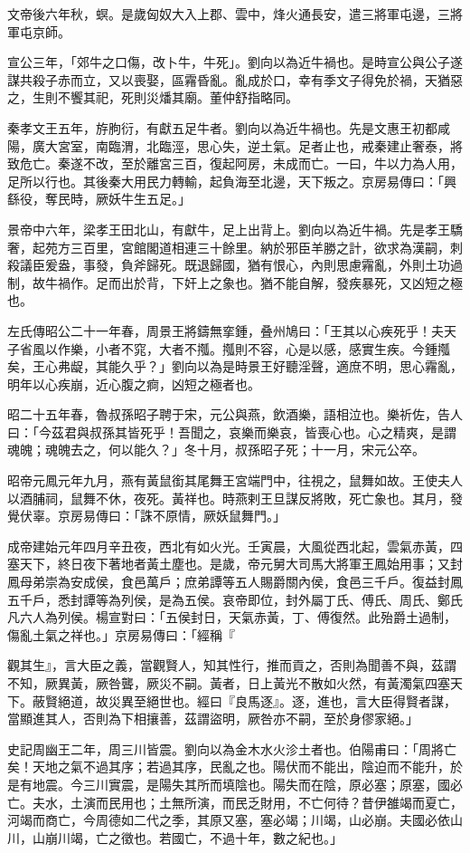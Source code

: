 \begin{pinyinscope}
文帝後六年秋，螟。是歲匈奴大入上郡、雲中，烽火通長安，遣三將軍屯邊，三將軍屯京師。

宣公三年，「郊牛之口傷，改卜牛，牛死」。劉向以為近牛禍也。是時宣公與公子遂謀共殺子赤而立，又以喪娶，區霿昏亂。亂成於口，幸有季文子得免於禍，天猶惡之，生則不饗其祀，死則災燔其廟。董仲舒指略同。

秦孝文王五年，斿朐衍，有獻五足牛者。劉向以為近牛禍也。先是文惠王初都咸陽，廣大宮室，南臨渭，北臨涇，思心失，逆土氣。足者止也，戒秦建止奢泰，將致危亡。秦遂不改，至於離宮三百，復起阿房，未成而亡。一曰，牛以力為人用，足所以行也。其後秦大用民力轉輸，起負海至北邊，天下叛之。京房易傳曰：「興繇役，奪民時，厥妖牛生五足。」

景帝中六年，梁孝王田北山，有獻牛，足上出背上。劉向以為近牛禍。先是孝王驕奢，起苑方三百里，宮館閣道相連三十餘里。納於邪臣羊勝之計，欲求為漢嗣，刺殺議臣爰盎，事發，負斧歸死。既退歸國，猶有恨心，內則思慮霿亂，外則土功過制，故牛禍作。足而出於背，下奸上之象也。猶不能自解，發疾暴死，又凶短之極也。

左氏傳昭公二十一年春，周景王將鑄無挛鍾，叠州鳩曰：「王其以心疾死乎！夫天子省風以作樂，小者不窕，大者不摦。摦則不容，心是以感，感實生疾。今鍾摦矣，王心弗龊，其能久乎？」劉向以為是時景王好聽淫聲，適庶不明，思心霿亂，明年以心疾崩，近心腹之痾，凶短之極者也。

昭二十五年春，魯叔孫昭子聘于宋，元公與燕，飲酒樂，語相泣也。樂祈佐，告人曰：「今茲君與叔孫其皆死乎！吾聞之，哀樂而樂哀，皆喪心也。心之精爽，是謂魂魄；魂魄去之，何以能久？」冬十月，叔孫昭子死；十一月，宋元公卒。

昭帝元鳳元年九月，燕有黃鼠銜其尾舞王宮端門中，往視之，鼠舞如故。王使夫人以酒脯祠，鼠舞不休，夜死。黃祥也。時燕剌王旦謀反將敗，死亡象也。其月，發覺伏辜。京房易傳曰：「誅不原情，厥妖鼠舞門。」

成帝建始元年四月辛丑夜，西北有如火光。壬寅晨，大風從西北起，雲氣赤黃，四塞天下，終日夜下著地者黃土塵也。是歲，帝元舅大司馬大將軍王鳳始用事；又封鳳母弟崇為安成侯，食邑萬戶；庶弟譚等五人賜爵關內侯，食邑三千戶。復益封鳳五千戶，悉封譚等為列侯，是為五侯。哀帝即位，封外屬丁氏、傅氏、周氏、鄭氏凡六人為列侯。楊宣對曰：「五侯封日，天氣赤黃，丁、傅復然。此殆爵土過制，傷亂土氣之祥也。」京房易傳曰：「經稱『

觀其生』，言大臣之義，當觀賢人，知其性行，推而貢之，否則為聞善不與，茲謂不知，厥異黃，厥咎聾，厥災不嗣。黃者，日上黃光不散如火然，有黃濁氣四塞天下。蔽賢絕道，故災異至絕世也。經曰『良馬逐』。逐，進也，言大臣得賢者謀，當顯進其人，否則為下相攘善，茲謂盜明，厥咎亦不嗣，至於身僇家絕。」

史記周幽王二年，周三川皆震。劉向以為金木水火沴土者也。伯陽甫曰：「周將亡矣！天地之氣不過其序；若過其序，民亂之也。陽伏而不能出，陰迫而不能升，於是有地震。今三川實震，是陽失其所而填陰也。陽失而在陰，原必塞；原塞，國必亡。夫水，土演而民用也；土無所演，而民乏財用，不亡何待？昔伊雒竭而夏亡，河竭而商亡，今周德如二代之季，其原又塞，塞必竭；川竭，山必崩。夫國必依山川，山崩川竭，亡之徵也。若國亡，不過十年，數之紀也。」


\end{pinyinscope}

